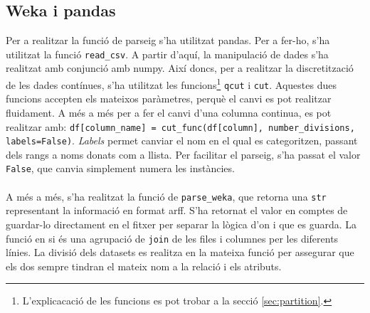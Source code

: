 \subsection{Weka i pandas}
	Per a realitzar la funció de parseig s'ha utilitzat pandas. Per a fer-ho, s'ha utilitzat la funció
	\verb|read_csv|.  A partir d'aquí, la manipulació de dades s'ha realitzat amb conjunció amb 
	numpy. Així doncs, per a realitzar la discretització de les dades contínues, s'ha utilitzat les
	funcions\footnote{L'explicacació de les funcions es pot trobar a la secció \ref{sec:partition}.} \texttt{qcut} i \texttt{cut}. Aquestes dues funcions
	accepten els mateixos paràmetres, perquè el canvi es pot realitzar fluidament. A més a més
	per a fer el canvi d'una columna continua, es pot realitzar amb:
	\verb|df[column_name] = cut_func(df[column], number_divisions, labels=False)|. 
	\textit{Labels} permet canviar el nom en el qual es categoritzen, passant dels rangs a noms
	donats com a llista. Per facilitar el parseig, s'ha passat el valor \texttt{False}, que canvia simplement numera les instàncies. \\
	\\
	A més a més, s'ha realitzat la funció de \verb|parse_weka|, que retorna una \texttt{str} 
	representant la informació en format arff. S'ha retornat el valor en comptes de guardar-lo directament
	en el fitxer per separar la lògica d'on i que es guarda. La funció en si és una agrupació de 
	\texttt{join} de les files i columnes per les diferents línies. La divisió dels datasets es realitza
	en la mateixa funció per assegurar que els dos sempre tindran el mateix nom a la relació i els
	atributs.
